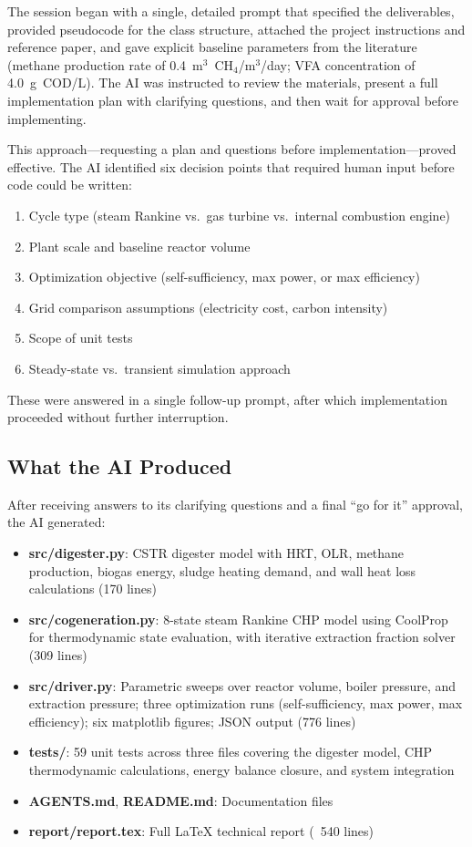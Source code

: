 \documentclass[12pt, letterpaper]{article}
\begin{document}
The session began with a single, detailed prompt that specified the deliverables, provided pseudocode for the class structure, attached the project instructions and reference paper, and gave explicit baseline parameters from the literature (methane production rate of 0.4~m$^3$~CH$_4$/m$^3$/day; VFA concentration of 4.0~g~COD/L). The AI was instructed to review the materials, present a full implementation plan with clarifying questions, and then wait for approval before implementing.

This approach---requesting a plan and questions before implementation---proved effective. The AI identified six decision points that required human input before code could be written:

\begin{enumerate}[noitemsep]
    \item Cycle type (steam Rankine vs.\ gas turbine vs.\ internal combustion engine)
    \item Plant scale and baseline reactor volume
    \item Optimization objective (self-sufficiency, max power, or max efficiency)
    \item Grid comparison assumptions (electricity cost, carbon intensity)
    \item Scope of unit tests
    \item Steady-state vs.\ transient simulation approach
\end{enumerate}

These were answered in a single follow-up prompt, after which implementation proceeded without further interruption.

\subsection{What the AI Produced}

After receiving answers to its clarifying questions and a final ``go for it'' approval, the AI generated:

\begin{itemize}[noitemsep]
    \item \textbf{src/digester.py}: CSTR digester model with HRT, OLR, methane production, biogas energy, sludge heating demand, and wall heat loss calculations (170 lines)
    \item \textbf{src/cogeneration.py}: 8-state steam Rankine CHP model using CoolProp for thermodynamic state evaluation, with iterative extraction fraction solver (309 lines)
    \item \textbf{src/driver.py}: Parametric sweeps over reactor volume, boiler pressure, and extraction pressure; three optimization runs (self-sufficiency, max power, max efficiency); six matplotlib figures; JSON output (776 lines)
    \item \textbf{tests/}: 59 unit tests across three files covering the digester model, CHP thermodynamic calculations, energy balance closure, and system integration
    \item \textbf{AGENTS.md}, \textbf{README.md}: Documentation files
    \item \textbf{report/report.tex}: Full LaTeX technical report (~540 lines)
\end{itemize}
\end{document}
